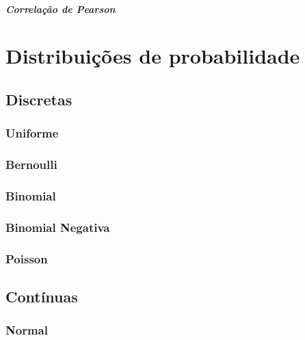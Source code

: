 \documentclass[
  letterpaper,
  DIV=11,
  numbers=noendperiod]{scrreprt}
\let\oldsubparagraph\subparagraph
\renewcommand{\subparagraph}[1]{\oldsubparagraph{#1}\mbox{}}
\begin{document}
\hypertarget{correlauxe7uxe3o-de-pearson}{%
\subparagraph{Correlação de Pearson}\label{correlauxe7uxe3o-de-pearson}}

\hypertarget{distribuiuxe7uxf5es-de-probabilidade}{%
\section{Distribuições de
probabilidade}\label{distribuiuxe7uxf5es-de-probabilidade}}

\hypertarget{discretas}{%
\subsection{Discretas}\label{discretas}}

\hypertarget{uniforme}{%
\subsubsection{Uniforme}\label{uniforme}}

\hypertarget{bernoulli}{%
\subsubsection{Bernoulli}\label{bernoulli}}

\hypertarget{binomial}{%
\subsubsection{Binomial}\label{binomial}}

\hypertarget{binomial-negativa}{%
\subsubsection{Binomial Negativa}\label{binomial-negativa}}

\hypertarget{poisson}{%
\subsubsection{Poisson}\label{poisson}}

\hypertarget{contuxednuas}{%
\subsection{Contínuas}\label{contuxednuas}}

\hypertarget{normal}{%
\subsubsection{Normal}\label{normal}}
\end{document}
